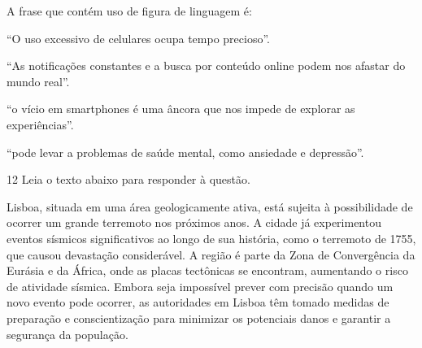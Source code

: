 
A frase que contém uso de figura de linguagem é:

\begin{escolha}
    
    \item ``O uso excessivo de celulares ocupa tempo precioso''.
    
    \item ``As notificações constantes e a busca por conteúdo online podem nos afastar do mundo real''.
    
    \item ``o vício em smartphones é uma âncora que nos impede de explorar as experiências''.
    
    \item ``pode levar a problemas de saúde mental, como ansiedade e depressão''.

\end{escolha}

\num{12} Leia o texto abaixo para responder à questão.

\begin{myquote}

Lisboa, situada em uma área geologicamente ativa, está sujeita à possibilidade
de ocorrer um grande terremoto nos próximos anos. A cidade já experimentou
eventos sísmicos significativos ao longo de sua história, como o terremoto de
1755, que causou devastação considerável. A região é parte da Zona de
Convergência da Eurásia e da África, onde as placas tectônicas se encontram,
aumentando o risco de atividade sísmica. Embora seja impossível prever com
precisão quando um novo evento pode ocorrer, as autoridades em Lisboa têm
tomado medidas de preparação e conscientização para minimizar os potenciais
danos e garantir a segurança da população.


\end{myquote}


